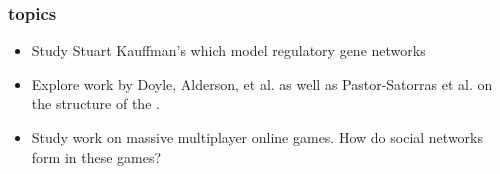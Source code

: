 
\begin{frame}
  \frametitle{topics}

  \begin{itemize}
  \item<1->
    Study Stuart Kauffman's  which model regulatory gene networks\cite{kauffman1993a}
  \item<2->
    Explore work by Doyle, Alderson, et al. 
    as well as Pastor-Satorras et al. on the structure 
    of the .
  \item<3->
     Study  work on massive multiplayer online games.  
    How do social networks
    form in these games?\cite{castronova2005a}
  \end{itemize}

\end{frame}






